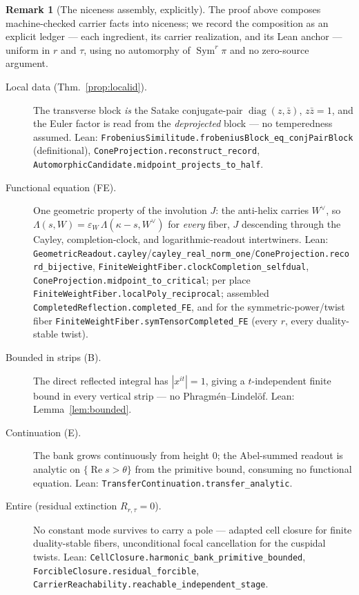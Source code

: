 \documentclass[11pt]{article}
\theoremstyle{definition}
\newtheorem{remark}[theorem]{Remark}
\renewcommand{\Re}{\operatorname{Re}}
\newcommand{\Sym}{\operatorname{Sym}}
\begin{document}
\begin{remark}[The niceness assembly, explicitly]\label{rem:niceness-assembly}
The proof above composes machine-checked carrier facts into niceness; we record the composition as an
explicit ledger --- each ingredient, its carrier realization, and its Lean anchor --- uniform in $r$
and $\tau$, using no automorphy of $\Sym^r\pi$ and no zero-source argument.
\begin{description}
\item[Local data (Thm.~\ref{prop:localid}).] The transverse block \emph{is} the Satake
conjugate-pair $\operatorname{diag}(z,\bar z)$, $z\bar z=1$, and the Euler factor is read from the
\emph{deprojected} block --- no temperedness assumed. Lean:
\texttt{FrobeniusSimilitude.frobeniusBlock\_eq\_conjPairBlock} (definitional),
\texttt{ConeProjection.reconstruct\_record}, \texttt{AutomorphicCandidate.midpoint\_projects\_to\_half}.
\item[Functional equation \textup{(FE)}.] One geometric property of the involution $J$: the anti-helix
carries $W^\vee$, so $\Lambda(s,W)=\varepsilon_W\,\Lambda(\kappa-s,W^\vee)$ for \emph{every} fiber, $J$
descending through the Cayley, completion-clock, and logarithmic-readout intertwiners. Lean:
\texttt{GeometricReadout.cayley}/\texttt{cayley\_real\_norm\_one}/\texttt{ConeProjection.record\_bijective},
\texttt{FiniteWeightFiber.clockCompletion\_selfdual}, \texttt{ConeProjection.midpoint\_to\_critical};
per place \texttt{FiniteWeightFiber.localPoly\_reciprocal}; assembled
\texttt{CompletedReflection.completed\_FE}, and for the symmetric-power/twist fiber
\texttt{FiniteWeightFiber.symTensorCompleted\_FE} (every $r$, every duality-stable twist).
\item[Bounded in strips \textup{(B)}.] The direct reflected integral has $|x^{it}|=1$, giving a
$t$-independent finite bound in every vertical strip --- no Phragm\'en--Lindel\"of. Lean:
Lemma~\ref{lem:bounded}.
\item[Continuation \textup{(E)}.] The bank grows continuously from height $0$; the Abel-summed readout
is analytic on $\{\Re s>\theta\}$ from the primitive bound, consuming no functional equation. Lean:
\texttt{TransferContinuation.transfer\_analytic}.
\item[Entire (residual extinction $R_{r,\tau}=0$).] No constant mode survives to carry a pole ---
adapted cell closure for finite duality-stable fibers, unconditional focal cancellation for the
cuspidal twists. Lean: \texttt{CellClosure.harmonic\_bank\_primitive\_bounded},
\texttt{ForcibleClosure.residual\_forcible}, \texttt{CarrierReachability.reachable\_independent\_stage}.

\end{description}
\end{remark}
\end{document}
